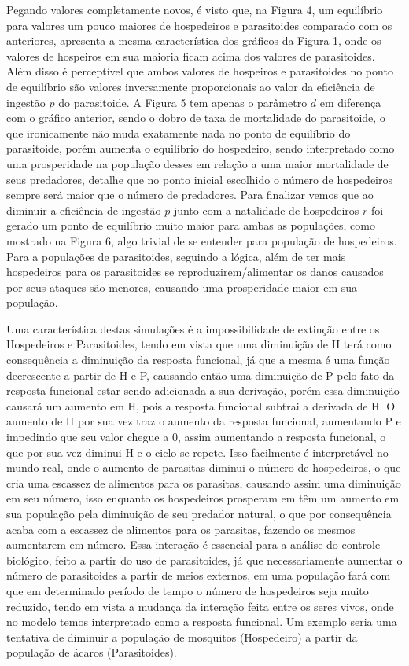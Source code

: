 Pegando valores completamente novos, é visto que, na Figura 4, um equilíbrio para valores um pouco maiores de hospedeiros e parasitoides comparado com os anteriores, apresenta a mesma característica dos gráficos da Figura 1, onde os valores de hospeiros em sua maioria ficam acima dos valores de parasitoides. Além disso é perceptível que ambos valores de hospeiros e parasitoides no ponto de equilíbrio são valores inversamente proporcionais ao valor da eficiência de ingestão $p$ do parasitoide. A Figura 5 tem apenas o parâmetro $d$ em diferença com o gráfico anterior,  sendo o dobro de taxa de mortalidade do parasitoide, o que ironicamente não muda exatamente nada no ponto de equilíbrio do parasitoide, porém aumenta o equilíbrio do hospedeiro, sendo interpretado como uma prosperidade na população desses em relação a uma maior mortalidade de seus predadores, detalhe que no ponto inicial escolhido o número de hospedeiros sempre será maior que o número de predadores. Para finalizar vemos que ao diminuir a eficiência de ingestão $p$ junto com a natalidade de hospedeiros $r$ foi gerado um ponto de equilíbrio muito maior para ambas as populações, como mostrado na Figura 6, algo trivial  de se entender para população de hospedeiros. Para a populações de parasitoides, seguindo a lógica, além de ter mais hospedeiros para os parasitoides se reproduzirem/alimentar os danos causados por seus ataques são menores, causando uma prosperidade maior em sua população.

Uma característica destas simulações  é a impossibilidade de extinção entre os Hospedeiros e Parasitoides, tendo em vista que uma diminuição de H terá como consequência a diminuição da resposta funcional, já que a mesma é uma função decrescente a partir de H e P, causando então uma diminuição de P pelo fato da resposta funcional estar sendo adicionada a sua derivação, porém essa diminuição causará um aumento em H, pois a resposta funcional subtrai a derivada de H. O aumento de H por sua vez traz o aumento da resposta funcional,  aumentando P e impedindo que seu valor chegue a 0, assim aumentando a resposta funcional, o que por sua vez diminui H e o ciclo se repete.  Isso facilmente é  interpretável no mundo real, onde o aumento de parasitas diminui o número de hospedeiros, o que cria uma escassez de alimentos para os parasitas, causando assim uma diminuição em seu número, isso enquanto os hospedeiros prosperam em têm um aumento em sua população pela diminuição de seu predador natural, o que por consequência acaba com a escassez de alimentos para os parasitas, fazendo os mesmos aumentarem em número. Essa interação é  essencial  para a análise do controle biológico, feito a partir do uso de parasitoides, já que necessariamente aumentar o número de parasitoides a partir de meios externos, em uma população fará com que em determinado período de tempo o número de hospedeiros seja muito reduzido, tendo em vista a mudança da interação feita entre os seres vivos, onde no modelo temos interpretado como a resposta funcional. Um exemplo seria uma tentativa de diminuir a população de mosquitos (Hospedeiro) a partir da população de ácaros (Parasitoides).


